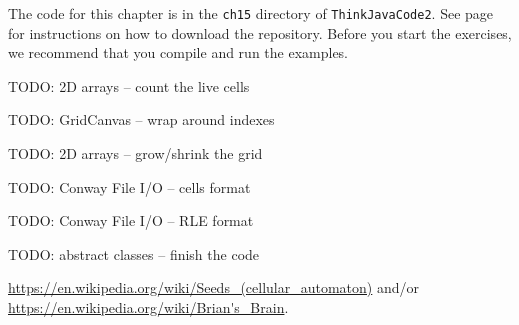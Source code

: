 The code for this chapter is in the {\tt ch15} directory of {\tt ThinkJavaCode2}.
See page~\pageref{code} for instructions on how to download the repository.
Before you start the exercises, we recommend that you compile and run the examples.


\begin{exercise}
TODO: 2D arrays -- count the live cells
\end{exercise}


\begin{exercise}
TODO: GridCanvas -- wrap around indexes
\end{exercise}


\begin{exercise}
TODO: 2D arrays -- grow/shrink the grid
\end{exercise}


\begin{exercise}
TODO: Conway File I/O -- cells format
\end{exercise}


\begin{exercise}
TODO: Conway File I/O -- RLE format
\end{exercise}


\begin{exercise}
TODO: abstract classes -- finish the code
\end{exercise}

%


\begin{exercise}
\url{https://en.wikipedia.org/wiki/Seeds_(cellular_automaton)}
and/or
\url{https://en.wikipedia.org/wiki/Brian's_Brain}.
\end{exercise}
